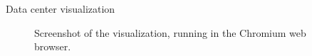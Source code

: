 \documentclass[xcolor=dvipsnames]{beamer}
\begin{document}
\begin{frame}{Data center visualization}

\begin{figure}
\centering
{}
\caption{Screenshot of the visualization, running in the Chromium web browser.}
\end{figure}

\end{frame}

% 
% 
\end{document}
